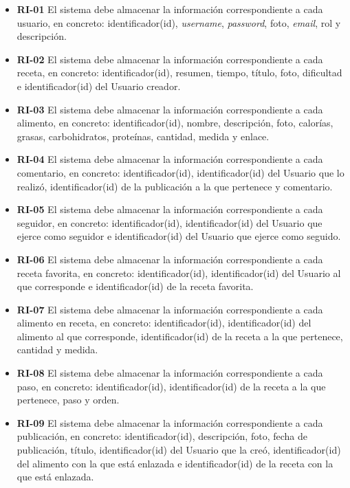 \begin{itemize}
    
\item \textbf{RI-01} El sistema debe almacenar la información correspondiente a cada usuario, en concreto: identificador(id), \textit{username}, \textit{password}, foto, \textit{email}, rol y descripción.
\item \textbf{RI-02} El sistema debe almacenar la información correspondiente a cada receta, en concreto: identificador(id), resumen, tiempo, título, foto, dificultad e identificador(id) del Usuario creador.
\item \textbf{RI-03} El sistema debe almacenar la información correspondiente a cada alimento, en concreto: identificador(id), nombre, descripción, foto, calorías, grasas, carbohidratos, proteínas, cantidad, medida y enlace.
\item \textbf{RI-04} El sistema debe almacenar la información correspondiente a cada comentario, en concreto: identificador(id), identificador(id) del Usuario que lo realizó, identificador(id) de la publicación a la que pertenece y comentario.
\item \textbf{RI-05} El sistema debe almacenar la información correspondiente a cada seguidor, en concreto: identificador(id), identificador(id) del Usuario que ejerce como seguidor e identificador(id) del Usuario que ejerce como seguido.
\item \textbf{RI-06} El sistema debe almacenar la información correspondiente a cada receta favorita, en concreto: identificador(id), identificador(id) del Usuario al que corresponde e identificador(id) de la receta favorita.
\item \textbf{RI-07} El sistema debe almacenar la información correspondiente a cada alimento en receta, en concreto: identificador(id), identificador(id) del alimento al que corresponde, identificador(id) de la receta a la que pertenece, cantidad y medida.
\item \textbf{RI-08} El sistema debe almacenar la información correspondiente a cada paso, en concreto: identificador(id), identificador(id) de la receta a la que pertenece, paso y orden.
\item \textbf{RI-09} El sistema debe almacenar la información correspondiente a cada publicación, en concreto: identificador(id), descripción, foto, fecha de publicación, título, identificador(id) del Usuario que la creó, identificador(id) del alimento con la que está enlazada e identificador(id) de la receta con la que está enlazada.


\end{itemize}

